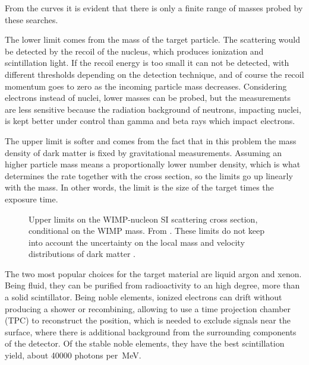 
From the curves it is evident that there is only a finite range of masses
probed by these searches.

The lower limit comes from the mass of the target particle. The scattering
would be detected by the recoil of the nucleus, which produces ionization and
scintillation light. If the recoil energy is too small it can not be detected,
with different thresholds depending on the detection technique, and of course
the recoil momentum goes to zero as the incoming particle mass decreases.
Considering electrons instead of nuclei, lower masses can be probed, but the
measurements are less sensitive because the radiation background of neutrons,
impacting nuclei, is kept better under control than gamma and beta rays which
impact electrons.

The upper limit is softer and comes from the fact that in this problem the mass
density of dark matter is fixed by gravitational measurements. Assuming an
higher particle mass means a proportionally lower number density, which is what
determines the rate together with the cross section, so the limits go up
linearly with the mass. In other words, the limit is the size of the target
times the exposure time.


\begin{figure}
    
    
    \caption{\label{fig:sigmalimits} Upper limits on the WIMP-nucleon SI
    scattering cross section, conditional on the WIMP mass. From
    \cite[fig.~27.1 p.~481]{zyla2020}. These limits do not keep into account
    the uncertainty on the local mass and velocity distributions of dark
    matter \cite[sec.~3.1]{baxter2021}.}
    
\end{figure}

The two most popular choices for the target material are liquid argon and
xenon. Being fluid, they can be purified from radioactivity to an high degree,
more than a solid scintillator. Being noble elements, ionized electrons can
drift without producing a shower or recombining, allowing to use a time
projection chamber (TPC) to reconstruct the position, which is needed to
exclude signals near the surface, where there is additional background from the
surrounding components of the detector. Of the stable noble elements, they have
the best scintillation yield, about \num{40000} photons per~\si{MeV}.

